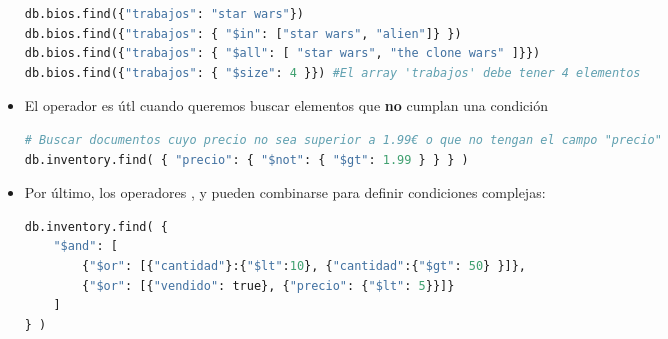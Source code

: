 \begin{itemize}
\begin{lstlisting}[language=python]
db.bios.find({"trabajos": "star wars"})
db.bios.find({"trabajos": { "$in": ["star wars", "alien"]} })
db.bios.find({"trabajos": { "$all": [ "star wars", "the clone wars" ]}})
db.bios.find({"trabajos": { "$size": 4 }}) #El array 'trabajos' debe tener 4 elementos
\end{lstlisting}
\item El operador  es útl cuando queremos buscar elementos que \textbf{no} cumplan una condición
\begin{lstlisting}[language=python]
# Buscar documentos cuyo precio no sea superior a 1.99€ o que no tengan el campo "precio"
db.inventory.find( { "precio": { "$not": { "$gt": 1.99 } } } )
\end{lstlisting}
\item Por último, los operadores ,  y  pueden combinarse para definir condiciones complejas:
\begin{lstlisting}[language=python]
db.inventory.find( { 
	"$and": [
		{"$or": [{"cantidad"}:{"$lt":10}, {"cantidad":{"$gt": 50} }]},
		{"$or": [{"vendido": true}, {"precio": {"$lt": 5}}]}
	]
} )
\end{lstlisting}
\end{itemize}

